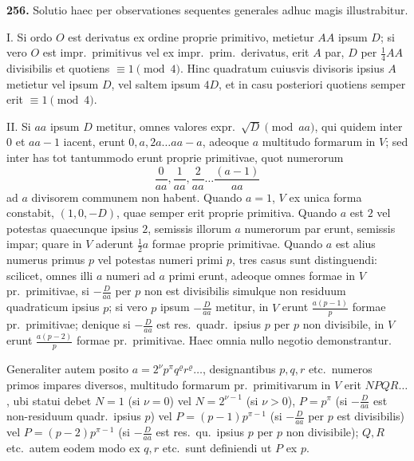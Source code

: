 \documentclass[12pt,a4paper]{article}
\theoremstyle{plain}
\theoremstyle{definition}
\theoremstyle{remark}
\theoremstyle{problemstyle}
\begin{document}
\textbf{256.} Solutio haec per observationes sequentes generales adhuc magis illustrabitur.

I. Si ordo $O$ est derivatus ex ordine proprie primitivo, metietur $AA$ ipsum $D$; si vero $O$ est impr.\ primitivus vel ex impr.\ prim.\ derivatus, erit $A$ par, $D$ per $\tfrac{1}{4}AA$ divisibilis et quotiens $\equiv 1 \pmod{4}$. Hinc quadratum cuiusvis divisoris ipsius $A$ metietur vel ipsum $D$, vel saltem ipsum $4D$, et in casu posteriori quotiens semper erit $\equiv 1 \pmod{4}$.

II. Si $aa$ ipsum $D$ metitur, omnes valores expr.\ $\sqrt{D} \pmod{aa}$, qui quidem inter $0$ et $aa - 1$ iacent, erunt $0, a, 2a \ldots aa - a$, adeoque $a$ multitudo formarum in $V$; sed inter has tot tantummodo erunt proprie primitivae, quot numerorum
\[
\frac{0}{aa}, \frac{1}{aa}, \frac{2}{aa} \ldots \frac{(a-1)}{aa}
\]
ad $a$ divisorem communem non habent. Quando $a = 1$, $V$ ex unica forma constabit, $(1, 0, -D)$, quae semper erit proprie primitiva. Quando $a$ est $2$ vel potestas quaecunque ipsius $2$, semissis illorum $a$ numerorum par erunt, semissis impar; quare in $V$ aderunt $\tfrac{1}{2}a$ formae proprie primitivae. Quando $a$ est alius numerus primus $p$ vel potestas numeri primi $p$, tres casus sunt distinguendi: scilicet, omnes illi $a$ numeri ad $a$ primi erunt, adeoque omnes formae in $V$ pr.\ primitivae, si $-\frac{D}{aa}$ per $p$ non est divisibilis simulque non residuum quadraticum ipsius $p$; si vero $p$ ipsum $-\frac{D}{aa}$ metitur, in $V$ erunt $\frac{a(p-1)}{p}$ formae pr.\ primitivae; denique si $-\frac{D}{aa}$ est res.\ quadr.\ ipsius $p$ per $p$ non divisibile, in $V$ erunt $\frac{a(p-2)}{p}$ formae pr.\ primitivae. Haec omnia nullo negotio demonstrantur.

Generaliter autem posito $a = 2^\nu p^\pi q^\varrho r^\varrho \ldots$, designantibus $p, q, r$ etc.\ numeros primos impares diversos, multitudo formarum pr.\ primitivarum in $V$ erit $NPQR\ldots$, ubi statui debet $N = 1$ (si $\nu = 0$) vel $N = 2^{\nu - 1}$ (si $\nu > 0$), $P = p^\pi$ (si $-\frac{D}{aa}$ est non-residuum quadr.\ ipsius $p$) vel $P = (p - 1)p^{\pi - 1}$ (si $-\frac{D}{aa}$ per $p$ est divisibilis) vel $P = (p - 2)p^{\pi - 1}$ (si $-\frac{D}{aa}$ est res.\ qu.\ ipsius $p$ per $p$ non divisibile); $Q, R$ etc.\ autem eodem modo ex $q, r$ etc.\ sunt definiendi ut $P$ ex $p$.
\end{document}
